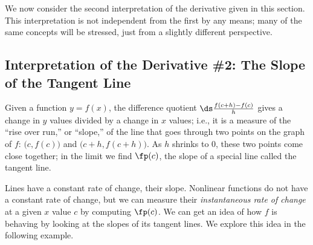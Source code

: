 We now consider the second interpretation of the derivative given in this section. This interpretation is not independent from the first by any means; many of the same concepts will be stressed, just from a slightly different perspective.

\subsection{Interpretation of the Derivative \#2: The Slope of the Tangent Line}

Given a function $y=f(x)$, the difference quotient $\ds \frac{f(c+h)-f(c)}{h}$ gives a change in $y$ values divided by a change in $x$ values; i.e., it is a measure of the ``rise over run,'' or ``slope,'' of the line that goes through two points on the graph of $f$: $\bigl(c, f(c)\bigr)$ and $\bigl(c+h,f(c+h)\bigr)$. As $h$ shrinks to 0, these two points come close together; in the limit we find $\fp(c)$, the slope of a special line called the tangent line. %

Lines have a constant rate of change, their slope. Nonlinear functions do not have a constant rate of change, but we can measure their \emph{instantaneous rate of change} at a given $x$ value $c$ by computing $\fp(c)$. We can get an idea of how $f$ is behaving by looking at the slopes of its tangent lines. We explore this idea in the following example.


